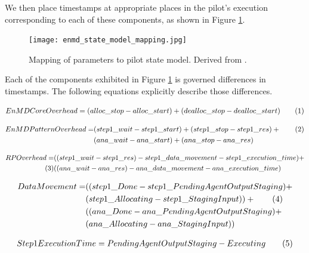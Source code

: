 \documentclass[]{article}
\newcommand\numberthis{\addtocounter{equation}{1}\tag{\theequation}}
\begin{document}
			We then place timestamps at appropriate places in the pilot's execution corresponding to each of these components, as shown in Figure \ref{fig:param_pilot_state_mapping}.


			\begin{figure}[H]
				\centering
				\texttt{[image: enmd\_state\_model\_mapping.jpg]}
				\caption{Mapping of parameters to pilot state model. Derived from \cite{rp_state_diagram}.}
				\label{fig:param_pilot_state_mapping}
			\end{figure}


			Each of the components exhibited in Figure \ref{fig:param_pilot_state_mapping} is governed differences in timestamps. The following equations explicitly describe those differences.

			\begin{align*}
				EnMD Core Overhead = (alloc\_stop - alloc\_start) + (dealloc\_stop - dealloc\_start) \numberthis \label{1}
			\end{align*}

			\begin{align*}
				EnMD Pattern Overhead = &(step1\_wait-step1\_start) + (step1\_stop - step1\_res) + \numberthis \label{2} \\
										&(ana\_wait-ana\_start) + (ana\_stop - ana\_res) 
			\end{align*}

			\begin{align*}
				RP Overhead = &((step1\_wait - step1\_res) - step1\_data\_movement - step1\_execution\_time) + \\ \numberthis \label{3} 
							  &((ana\_wait - ana\_res) - ana\_data\_movement - ana\_execution\_time) 
			\end{align*}

			\begin{align*}
				Data Movement = &((step1\_Done - step1\_PendingAgentOutputStaging) + \\
								&(step1\_Allocating - step1\_StagingInput)) + \numberthis \label{4} \\
								&((ana\_Done - ana\_PendingAgentOutputStaging) + \\
								&(ana\_Allocating - ana\_StagingInput)) 
			\end{align*}
			
			\begin{align*}
				Step 1 Execution Time = PendingAgentOutputStaging - Executing \numberthis \label{5}
			\end{align*}
\end{document}
